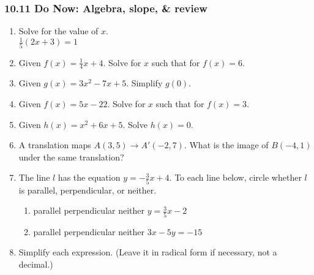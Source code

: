 \documentclass[12pt, twoside]{article}
\begin{document}
\subsubsection*{10.11 Do Now: Algebra, slope, \& review}
 \begin{enumerate}

  \item   Solve for the value of $x$.\\[0.5cm]
  $\frac{1}{5}(2x+3)=1$ \vspace{3cm}

  \item Given $f(x)=\frac{1}{4} x+4$. Solve for $x$ such that for $f(x)=6$. \vspace{3.5cm}
  \item Given $g(x)=3x^2-7x+5$. Simplify $g(0)$. \vspace{2cm}
  \item Given $f(x)=5x-22$. Solve for $x$ such that for $f(x)=3$. \vspace{3.5cm}
  \item Given $h(x)=x^2+6x+5$. Solve $h(x)=0$. \vspace{3cm}

\newpage
  \item A translation maps $A(3,5) \rightarrow A'(-2,7)$. What is the image of $B(-4,1)$ under the same translation?  \vspace{1.5cm}

  \item The line $l$ has the equation $y=-\frac{3}{5}x+4$. To each line below, circle whether $l$ is parallel, perpendicular, or neither.
    \begin{enumerate}
      \item parallel \quad perpendicular \quad neither \qquad $y=\frac{3}{5}x-2$
      \vspace{0.5cm}
      \item parallel \quad perpendicular \quad neither \qquad $3x-5y=-15$
      \vspace{2.5cm}
    \end{enumerate}

  \item Simplify each expression. (Leave it in radical form if necessary, not a decimal.)
    \begin{enumerate}
    \end{enumerate} \vspace{2cm}



\end{enumerate}
\end{document}
